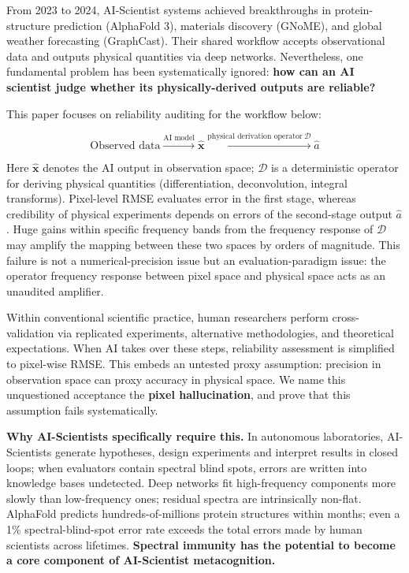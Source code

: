 \documentclass[9pt,twocolumn]{article}
\theoremstyle{remark}
\theoremstyle{definition}
\begin{document}
From 2023 to 2024, AI-Scientist systems achieved breakthroughs in protein-structure prediction (AlphaFold 3\cite{abramson2024}), materials discovery (GNoME\cite{merchant2023}), and global weather forecasting (GraphCast\cite{lam2023}). Their shared workflow accepts observational data and outputs physical quantities via deep networks. Nevertheless, one fundamental problem has been systematically ignored: \textbf{how can an AI scientist judge whether its physically-derived outputs are reliable?}

This paper focuses on reliability auditing for the workflow below:

\begin{equation}
\label{eq:workflow}
\text{Observed data} \xrightarrow{\text{AI model}} \hat{\mathbf{x}} \xrightarrow{\text{physical derivation operator}\ \mathcal{D}} \hat{a}
\end{equation}

Here $\hat{\mathbf{x}}$ denotes the AI output in observation space; $\mathcal{D}$ is a deterministic operator for deriving physical quantities (differentiation, deconvolution, integral transforms). Pixel-level RMSE evaluates error in the first stage, whereas credibility of physical experiments depends on errors of the second-stage output $\hat{a}$. Huge gains within specific frequency bands from the frequency response of $\mathcal{D}$ may amplify the mapping between these two spaces by orders of magnitude. This failure is not a numerical-precision issue but an evaluation-paradigm issue: the operator frequency response between pixel space and physical space acts as an unaudited amplifier.

Within conventional scientific practice, human researchers perform cross-validation via replicated experiments, alternative methodologies, and theoretical expectations. When AI takes over these steps, reliability assessment is simplified to pixel-wise RMSE. This embeds an untested proxy assumption: precision in observation space can proxy accuracy in physical space. We name this unquestioned acceptance the \textbf{pixel hallucination}, and prove that this assumption fails systematically.

\textbf{Why AI-Scientists specifically require this.} In autonomous laboratories\cite{burger2020}, AI-Scientists generate hypotheses, design experiments and interpret results in closed loops; when evaluators contain spectral blind spots, errors are written into knowledge bases undetected. Deep networks fit high-frequency components more slowly than low-frequency ones\cite{xu2019,rahaman2019,tancik2020,ronen2019}; residual spectra are intrinsically non-flat. AlphaFold\cite{abramson2024} predicts hundreds-of-millions protein structures within months; even a 1\% spectral-blind-spot error rate exceeds the total errors made by human scientists across lifetimes. \textbf{Spectral immunity has the potential to become a core component of AI-Scientist metacognition.}
\end{document}
